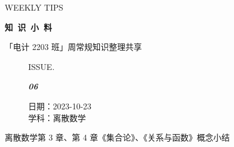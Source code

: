 \documentclass[UTF8]{ctexart}
\newcommand\Black[1]{\textcolor[gray]{0.3}{#1}}
\newcommand\Brown[1]{\textcolor[HTML]{998A4E}{#1}}
\newcommand\IssueNumber{06}
\newcommand\Date{2023-10-23}
\newcommand\Subject{离散数学}
\begin{document}
\BgThispage
\begin{center}
{\scriptsize\Issue \textcolor[HTML]{C8BA83}{WEEKLY TIPS}}

{\Huge\bfseries\TitleFont \Black{知\ 识\ 小\ 料}}

\vspace{-0.1cm}
{\footnotesize \Brown{「电计 2203 班」周常规知识整理共享}}
\end{center}

\vspace{-0.5cm}

\begin{figure}[H]
\hspace{1cm}
\begin{minipage}[t]{0.3\textwidth}
\centering
    \Brown{ISSUE.}

    \vspace{-0.6cm}
    \Huge \Issue\slshape\bfseries\Black{\IssueNumber}
\end{minipage}
\hfill
\begin{minipage}[t]{0.3\textwidth}
\centering
    \Brown{日期：\Date} \\
\vspace{-0.1cm}
    \Brown{学科：\Subject} \\
\end{minipage}
\hspace{0.8cm}
\end{figure}
\begin{center}\color{cyan!50!black}
离散数学第 3 章、第 4 章《集合论》、《关系与函数》概念小结
\end{center}
\end{document}
